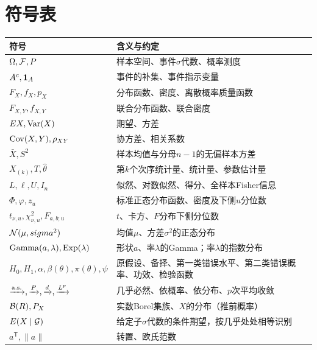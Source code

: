 \chapter{符号表}
\begin{longtable}{@{}p{}p{}@{}}\toprule
符号&含义与约定\\\midrule\endhead
$\Omega,\mathcal F,P$&样本空间、事件$\sigma$代数、概率测度\\
$A^c,\mathbf1_A$&事件的补集、事件指示变量\\
$F_X,f_X,p_X$&分布函数、密度、离散概率质量函数\\
$F_{X,Y},f_{X,Y}$&联合分布函数、联合密度\\
$E X,\operatorname{Var}(X)$&期望、方差\\
$\operatorname{Cov}(X,Y),\rho_{XY}$&协方差、相关系数\\
$\bar X,S^2$&样本均值与分母$n-1$的无偏样本方差\\
$X_{(k)},T,\hat\theta$&第$k$个次序统计量、统计量、参数估计量\\
$L,\ell,U,I_n$&似然、对数似然、得分、全样本Fisher信息\\
$\Phi,\varphi,z_u$&标准正态分布函数、密度及下侧$u$分位数\\
$t_{\nu,u},\chi^2_{\nu,u},F_{a,b;u}$&$t$、卡方、$F$分布下侧分位数\\
$\mathcal N(\mu,sigma^2)$&均值$\mu$、方差$\sigma^2$的正态分布\\
$\operatorname{Gamma}(a,\lambda),\operatorname{Exp}(\lambda)$&形状$a$、率$\lambda$的Gamma；率$\lambda$的指数分布\\
$H_0,H_1,\alpha,\beta(\theta),\pi(\theta),\psi$&原假设、备择、第一类错误水平、第二类错误概率、功效、检验函数\\
$\xrightarrow{\mathrm{a.s.}},\xrightarrow{P},\xrightarrow{d},\xrightarrow{L^p}$&几乎必然、依概率、依分布、$p$次平均收敛\\
$\mathcal B(R),P_X$&实数Borel集族、$X$的分布（推前概率）\\
$E(X\mid\mathcal G)$&给定子$\sigma$代数的条件期望，按几乎处处相等识别\\
$a^\mathsf T,\|a\|$&转置、欧氏范数\\\bottomrule
\end{longtable}
